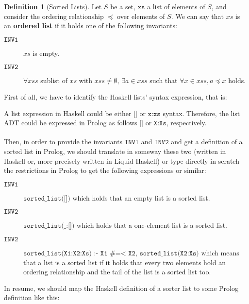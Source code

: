 \documentclass{report}
\theoremstyle{definition}
\theoremstyle{definition}
\newtheorem*{definition*}{Definition}
\begin{document}
\begin{definition*}[Sorted Lists]
	Let $S$ be a set, $\mathtt{xs}$ a list of elements of $S$, and consider the ordering relationship $\preceq$ over elements of $S$. We can say that $xs$ is an \textbf{ordered list} if it holds one of the following invariants:
	\begin{description}
		\item[$\mathtt{INV1}$] $xs$ is empty.
		\item[$\mathtt{INV2}$] $\forall xss$ sublist of $xs$ with $xss \neq \emptyset$, $\exists a \in xss$ such that $\forall x \in xss, a \preceq x$ holds.
	\end{description}
	First of all, we have to identify the Haskell lists' syntax expression, that is:
\end{definition*}
A list expression in Haskell could be either $\texttt{[]}$ or $\texttt{x:xs}$ syntax.
Therefore, the list ADT could be expressed in Prolog as follows $\texttt{[]}$ or $\texttt{X:Xs}$, respectively.\\\\
Then, in order to provide the invariants $\mathtt{INV1}$ and $\mathtt{INV2}$ and get a definition of a sorted list in Prolog, we should translate in someway these two (written in Haskell or, more precisely written in Liquid Haskell) or type directly in scratch the restrictions in Prolog to get the following expressions or similar:
\begin{description}
	\item[$\mathtt{INV1}$] $\texttt{sorted\_list([])}$ which holds that an empty list is a sorted list.
	\item[$\mathtt{INV2}$] $\texttt{sorted\_list(\_:[])}$ which holds that a one-element list is a sorted list.
	\item[$\mathtt{INV2}$] $\texttt{sorted\_list(X1:X2:Xs) :- X1 \#=< X2, sorted\_list(X2:Xs)}$ which means that a list is a sorted list if it holds that every two elements hold an ordering relationship and the tail of the list is a sorted list too.
\end{description}
In resume, we should map the Haskell definition of a sorter list to some Prolog definition like this:

\end{document}
